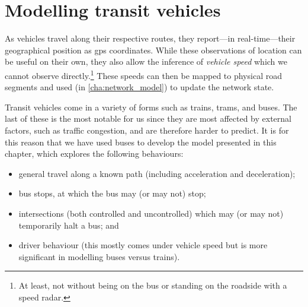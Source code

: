 
\chapter{Modelling transit vehicles}
\label{cha:vehicle_model}

\glsresetall{}

As vehicles travel along their respective routes, they report---in real-time---their geo\-graphical position as \gls{gps} coordinates. While these observations of location can be useful on their own, they also allow the inference of \emph{vehicle speed} which we cannot observe directly.\footnote{At least, not without being on the bus or standing on the roadside with a speed radar.} These speeds can then be mapped to physical road segments and used (in \cref{cha:network_model}) to update the network state.

Transit vehicles come in a variety of forms such as trains, trams, and buses. The last of these is the most notable for us since they are most affected by external factors, such as traffic congestion, and are therefore harder to predict. It is for this reason that we have used buses to develop the model presented in this chapter, which explores the following behaviours:
\begin{itemize}
\item general travel along a known path (including acceleration and deceleration);
\item bus stops, at which the bus may (or may not) stop;
\item intersections (both controlled and uncontrolled) which may (or may not) temporarily halt a bus; and
\item driver behaviour (this mostly comes under vehicle speed but is more significant in modelling buses versus trains).
\end{itemize}


